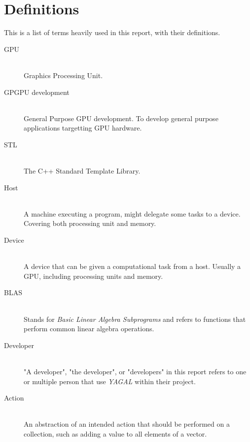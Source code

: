 \section*{Definitions}
This is a list of terms heavily used in this report, with their definitions.

\begin{description}
\item[GPU]\hfill\\
Graphics Processing Unit.
\item[GPGPU development]\hfill\\
General Purpose GPU development. To develop general purpose applications targetting GPU hardware.
\item[STL]\hfill\\
The C++ Standard Template Library.
\item[Host]\hfill\\
A machine executing a program, might delegate some tasks to a device. Covering both processing unit and memory.
\item[Device]\hfill\\
A device that can be given a computational task from a host. Usually a GPU, including processing units and memory.
\item[BLAS]\hfill\\
Stands for \textit{Basic Linear Algebra Subprograms} and refers to functions that perform common linear algebra operations.
\item[Developer]\hfill\\
"A developer", "the developer", or "developers" in this report refers to one or multiple person that use \textit{YAGAL} within their project.
\item[Action]\hfill\\
An abstraction of an intended action that should be performed on a collection, such as adding a value to all elements of a vector.
\end{description}
